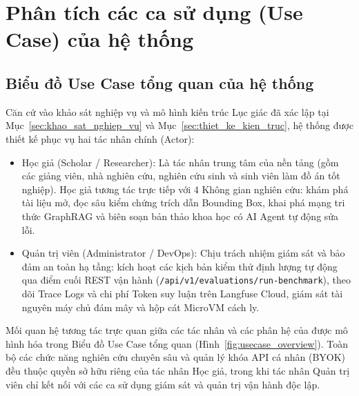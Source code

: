 \section{Phân tích các ca sử dụng (Use Case) của hệ thống}
\label{sec:phan_tich_usecase}

\subsection{Biểu đồ Use Case tổng quan của hệ thống}
\label{subsec:uc_tong_quan}

Căn cứ vào khảo sát nghiệp vụ và mô hình kiến trúc Lục giác đã xác lập tại Mục~\ref{sec:khao_sat_nghiep_vu} và Mục~\ref{sec:thiet_ke_kien_truc}, hệ thống \VS được thiết kế phục vụ hai tác nhân chính (Actor):
\begin{itemize}
    \item Học giả (Scholar / Researcher): Là tác nhân trung tâm của nền tảng (gồm các giảng viên, nhà nghiên cứu, nghiên cứu sinh và sinh viên làm đồ án tốt nghiệp). Học giả tương tác trực tiếp với 4 Không gian nghiên cứu: khám phá tài liệu mở, đọc sâu kiểm chứng trích dẫn Bounding Box, khai phá mạng tri thức GraphRAG và biên soạn bản thảo khoa học có AI Agent tự động sửa lỗi.
    \item Quản trị viên (Administrator / DevOps): Chịu trách nhiệm giám sát và bảo đảm an toàn hạ tầng: kích hoạt các kịch bản kiểm thử định lượng tự động qua điểm cuối REST vận hành (\texttt{/api/v1/evaluations/run-benchmark}), theo dõi Trace Logs và chi phí Token suy luận trên Langfuse Cloud, giám sát tài nguyên máy chủ đám mây và hộp cát MicroVM cách ly.
\end{itemize}

Mối quan hệ tương tác trực quan giữa các tác nhân và các phân hệ của \VS được mô hình hóa trong Biểu đồ Use Case tổng quan (Hình~\ref{fig:usecase_overview}). Toàn bộ các chức năng nghiên cứu chuyên sâu và quản lý khóa API cá nhân (BYOK) đều thuộc quyền sở hữu riêng của tác nhân Học giả, trong khi tác nhân Quản trị viên chỉ kết nối với các ca sử dụng giám sát và quản trị vận hành độc lập.


